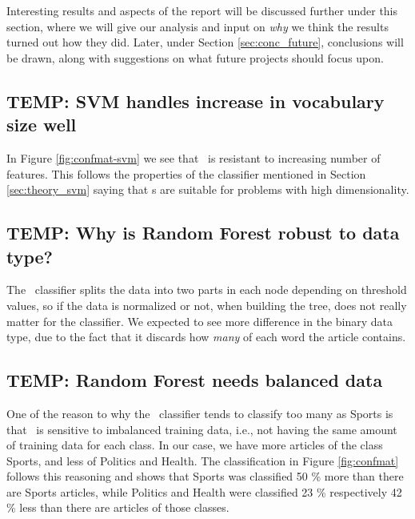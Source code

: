Interesting results and aspects of the report will be discussed further under this section, where we will give our analysis and input on \emph{why} we think the results turned out how they did. Later, under Section \ref{sec:conc_future}, conclusions will be drawn, along with suggestions on what future projects should focus upon.

\subsection{TEMP: SVM handles increase in vocabulary size well} %
In Figure \ref{fig:confmat-svm} we see that \svm\ is resistant to increasing number of features. This follows the properties of the classifier mentioned in Section \ref{sec:theory_svm} saying that \svm s are suitable for problems with high dimensionality.

\subsection{TEMP: Why is Random Forest robust to data type?} %
\label{sub:temp_why_is_random_forest_robust_to_data_type_}
The \rf\ classifier splits the data into two parts in each node depending on threshold values, so if the data is normalized or not, when building the tree, does not really matter for the classifier. We expected to see more difference in the binary data type, due to the fact that it discards how \emph{many} of each word the article contains.

\subsection{TEMP: Random Forest needs balanced data} %
\label{sub:temp_random_forest_needs_balanced_data}
One of the reason to why the \rf\ classifier tends to classify too many as Sports is that \rf\ is sensitive to imbalanced training data, i.e., not having the same amount of training data for each class. In our case, we have more articles of the class Sports, and less of Politics and Health. The classification in Figure \ref{fig:confmat} follows this reasoning and shows that Sports was classified 50 \% more than there are Sports articles, while Politics and Health were classified 23 \% respectively 42 \% less than there are articles of those classes.

